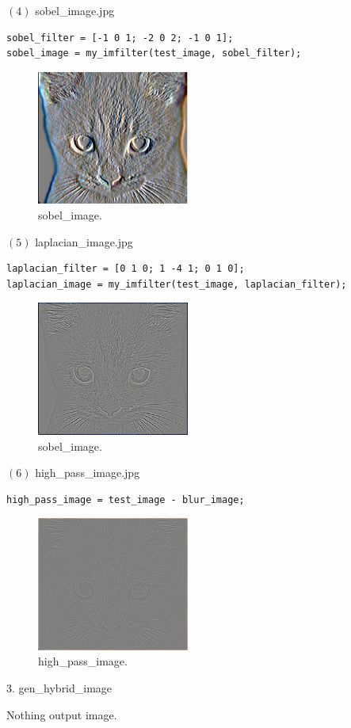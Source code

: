 $(4)$ sobel\_image.jpg
\begin{lstlisting}[style=Matlab-editor]
sobel_filter = [-1 0 1; -2 0 2; -1 0 1]; 
sobel_image = my_imfilter(test_image, sobel_filter);
\end{lstlisting}
\begin{figure}[!h]
    \centering
    \includegraphics[width=5cm]{sobel_image.jpg}
    \caption{sobel\_image.}
    \label{fig:result4}
\end{figure}
\pagebreak
$(5)$ laplacian\_image.jpg
\begin{lstlisting}[style=Matlab-editor]
laplacian_filter = [0 1 0; 1 -4 1; 0 1 0];
laplacian_image = my_imfilter(test_image, laplacian_filter);
\end{lstlisting}
\begin{figure}[!h]
    \centering
    \includegraphics[width=5cm]{laplacian_image.jpg}
    \caption{sobel\_image.}
    \label{fig:result5}
\end{figure}

$(6)$ high\_pass\_image.jpg
\begin{lstlisting}[style=Matlab-editor]
high_pass_image = test_image - blur_image; 
\end{lstlisting}
\begin{figure}[!h]
    \centering
    \includegraphics[width=5cm]{high_pass_image.jpg}
    \caption{high\_pass\_image.}
    \label{fig:result6}
\end{figure}
{\large $3.$ gen\_hybrid\_image \par}
\tab Nothing output image.

